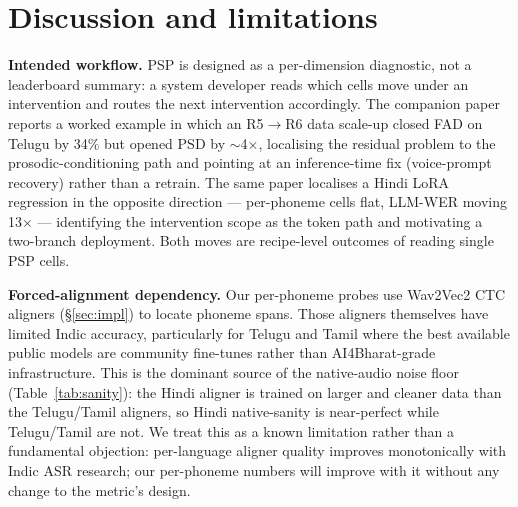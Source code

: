 \documentclass[conference,a4paper]{IEEEtran}
\newcommand{\psp}{\textsc{PSP}}
\begin{document}
\section{Discussion and limitations}
\label{sec:limitations}

\textbf{Intended workflow.} \psp{} is designed as a per-dimension diagnostic, not a leaderboard summary: a system developer reads which cells move under an intervention and routes the next intervention accordingly. The companion paper~\cite{praxy2026} reports a worked example in which an R5$\to$R6 data scale-up closed FAD on Telugu by 34\% but opened PSD by $\sim$4$\times$, localising the residual problem to the prosodic-conditioning path and pointing at an inference-time fix (voice-prompt recovery) rather than a retrain. The same paper localises a Hindi LoRA regression in the opposite direction --- per-phoneme cells flat, LLM-WER moving 13$\times$ --- identifying the intervention scope as the token path and motivating a two-branch deployment. Both moves are recipe-level outcomes of reading single \psp{} cells.

\textbf{Forced-alignment dependency.} Our per-phoneme probes use Wav2Vec2 CTC aligners (\S\ref{sec:impl}) to locate phoneme spans. Those aligners themselves have limited Indic accuracy, particularly for Telugu and Tamil where the best available public models are community fine-tunes rather than AI4Bharat-grade infrastructure. This is the dominant source of the native-audio noise floor (Table~\ref{tab:sanity}): the Hindi aligner is trained on larger and cleaner data than the Telugu/Tamil aligners, so Hindi native-sanity is near-perfect while Telugu/Tamil are not. We treat this as a known limitation rather than a fundamental objection: per-language aligner quality improves monotonically with Indic ASR research; our per-phoneme numbers will improve with it without any change to the metric's design.
\end{document}
